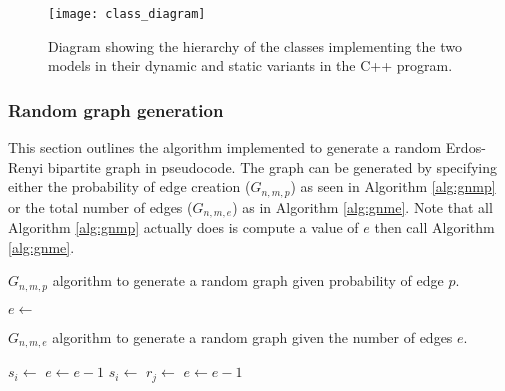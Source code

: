 \begin{figure}
  \centering
  \texttt{[image: class\_diagram]}
  \caption{Diagram showing the hierarchy of the classes implementing the two models in their dynamic and static variants in the C++ program.}
  \label{fig:class-diagram}
\end{figure}

\subsubsection{Random graph generation}

This section outlines the algorithm implemented to generate a random Erdos-Renyi bipartite graph in pseudocode.
The graph can be generated by specifying either the probability of edge creation ($G_{n,m,p}$) as seen in Algorithm \ref{alg:gnmp} or the total number of edges ($G_{n,m,e}$) as in Algorithm \ref{alg:gnme}.
Note that all Algorithm \ref{alg:gnmp} actually does is compute a value of $e$ then call Algorithm \ref{alg:gnme}.


\begin{algorithm}
  \caption{$G_{n,m,p}$ algorithm to generate a random \nbym{} graph given probability of edge $p$.} \label{alg:gnmp}
\begin{algorithmic}[1]
    \State $e \gets$ 
    \State \Return {}
  \EndProcedure
\end{algorithmic}
\end{algorithm}

\begin{algorithm}
  \caption{$G_{n,m,e}$ algorithm to generate a random \nbym{} graph given the number of edges $e$.} \label{alg:gnmp}
  \begin{algorithmic}[1]
          \State $s_i \gets$ 
          \State {}
          \State $e \gets e - 1$
        \EndFor
      \EndIf
        \State $s_i \gets$ 
        \State $r_j \gets$ 
        \State {}
        \State $e \gets e - 1$
      \EndWhile
    \EndProcedure  
  \end{algorithmic}
\end{algorithm}

